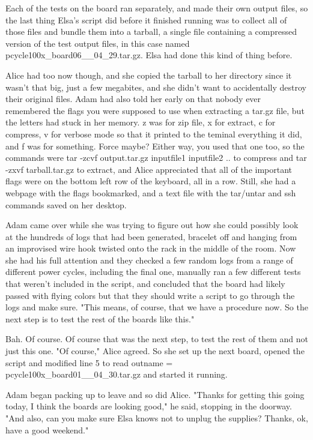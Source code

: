 Each of the tests on the board ran separately, and made their own output files, so the last thing Elsa's script did before it finished running was to collect all of those files and bundle them into a tarball, a single file containing a compressed version of the test output files, in this case named {\ttfamily pcycle100x\_\-board06\_\_04\_29.tar.gz}. Elsa had done this kind of thing before. 

Alice had too now though, and she copied the tarball to her directory since it wasn't that big, just a few megabites, and she didn't want to accidentally destroy their original files. Adam had also told her early on that nobody ever remembered the flags you were supposed to use when extracting a tar.gz file, but the letters had stuck in her memory. {\ttfamily z} was for zip file, {\ttfamily x} for extract, {\ttfamily c} for compress, {\ttfamily v} for verbose mode so that it printed to the teminal everything it did, and {\ttfamily f} was for something. Force maybe? Either way, you used that one too, so the commands were {\ttfamily tar -zcvf output.tar.gz inputfile1 inputfile2 ..} to compress and  {\ttfamily tar -zxvf tarball.tar.gz} to extract, and Alice appreciated that all of the important flags were on the bottom left row of the keyboard, all in a row. Still, she had a webpage with the flags bookmarked, and a text file with the tar/untar and ssh commands saved on her desktop.

Adam came over while she was trying to figure out how she could possibly look at the hundreds of logs that had been generated, bracelet off and hanging from an improvised wire hook twisted onto the rack in the middle of the room. Now she had his full attention and they checked a few random logs from a range of different power cycles, including the final one, manually ran a few different tests that weren't included in the script, and concluded that the board had likely passed with flying colors but that they should write a script to go through the logs and make sure. "This means, of course, that we have a procedure now. So the next step is to test the rest of the boards like this." 

Bah. Of course. Of course that was the next step, to test the rest of them and not just this one. "Of course," Alice agreed. So she set up the next board, opened the script and modified line 5 to read {\ttfamily outname =} {\ttfamily  pcycle100x\_\-board01\_\_04\_30.tar.gz} and started it running.

Adam began packing up to leave and so did Alice. "Thanks for getting this going today, I think the boards are looking good," he said, stopping in the doorway. "And also, can you make sure Elsa knows not to unplug the supplies? Thanks, ok, have a good weekend."

